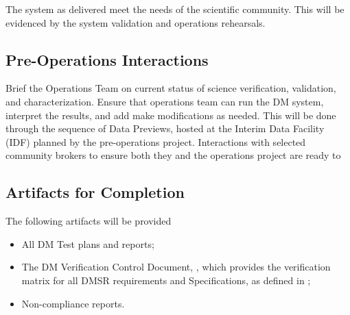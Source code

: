 The system as delivered meet the needs of the scientific community. 
This will be evidenced by the system validation and operations rehearsals. 

\subsection{Pre-Operations Interactions}

Brief the Operations Team on current status of science verification, validation, and characterization.
Ensure that operations team can run the DM system, interpret the results, and add make modifications as needed. 
This will be done through the sequence of Data Previews,  hosted at the Interim Data Facility (IDF) planned by the pre-operations project. 
Interactions with selected community brokers to ensure both they and the operations project are ready to 

\subsection{Artifacts for Completion}

The following artifacts will be provided 
\begin{itemize}
\item All DM Test plans and reports;
\item The DM Verification Control Document, , which provides the verification matrix for all DMSR requirements and Specifications, as defined in \cite{LSE-61};
\item Non-compliance reports.
\end{itemize}